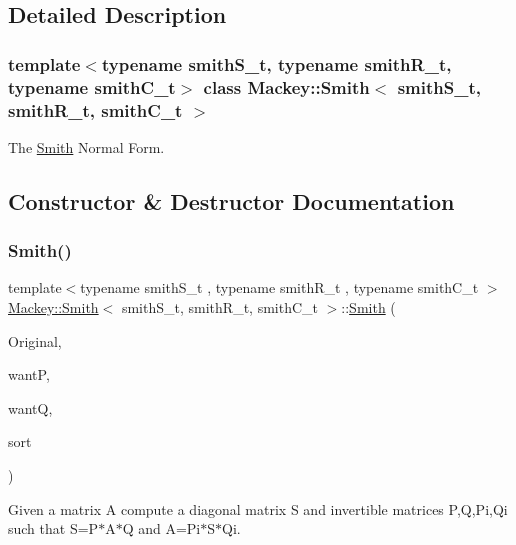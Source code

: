 \subsection{Detailed Description}
\subsubsection*{template$<$typename smith\+S\+\_\+t, typename smith\+R\+\_\+t, typename smith\+C\+\_\+t$>$\newline
class Mackey\+::\+Smith$<$ smith\+S\+\_\+t, smith\+R\+\_\+t, smith\+C\+\_\+t $>$}

The \hyperlink{classMackey_1_1Smith}{Smith} Normal Form. 

\subsection{Constructor \& Destructor Documentation}
\mbox{\label{classMackey_1_1Smith_a534aaf0e0b2da7d312d80ad7d67ae794}} 
\subsubsection{\texorpdfstring{Smith()}{Smith()}\hspace{0.1cm}{\footnotesize\ttfamily [1/2]}}
{\footnotesize\ttfamily template$<$typename smith\+S\+\_\+t , typename smith\+R\+\_\+t , typename smith\+C\+\_\+t $>$ \\
\hyperlink{classMackey_1_1Smith}{Mackey\+::\+Smith}$<$ smith\+S\+\_\+t, smith\+R\+\_\+t, smith\+C\+\_\+t $>$\+::\hyperlink{classMackey_1_1Smith}{Smith} (\begin{DoxyParamCaption}\item[{const smith\+S\+\_\+t \&}]{Original,  }\item[{bool}]{wantP,  }\item[{bool}]{wantQ,  }\item[{bool}]{sort }\end{DoxyParamCaption})}



Given a matrix A compute a diagonal matrix S and invertible matrices P,Q,Pi,Qi such that S=P$\ast$\+A$\ast$Q and A=Pi$\ast$\+S$\ast$\+Qi. 

